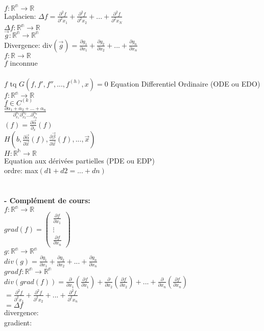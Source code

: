 \documentclass{article}
\begin{document}
    $f:\mathbb{R^n}\to \mathbb{R}$\\
    Laplacien: $\Delta f= \frac{\partial^2 f}{\partial^2 x_1} +
    \frac{\partial^2 f}{\partial^2 x_2}+...+\frac{\partial^2 f}{\partial^2 x_N}$\\
    $\Delta f: \mathbb{R^n}\to \mathbb{R}$\\
    $\vec{g}: \mathbb{R^n}\to \mathbb{R^n}$\\
    Divergence: div$(\vec{g})=\frac{\partial g_1}{\partial x_1}+
    \frac{\partial g_2}{\partial x_2}+...+
    \frac{\partial g_n}{\partial x_n}$\\
    $f:\mathbb{R}\to \mathbb{R}$\\
    $f$ inconnue\\\\
    $f$ tq $G(f,f',f'',...,f^{(h)},x)=0$ Equation Differentiel Ordinaire (ODE ou EDO)\\
    $f:\mathbb{R^n}\to \mathbb{R}$\\
    $f \in C^{(k)}$\\
    $\frac{\partial{\alpha_1 +\alpha_2+...+\alpha_n}}{\partial^{\alpha_1}_{x_1}
    \partial^{\alpha_2}_{x_2} ... \partial^{\alpha_n}_{x_n}}$\\
    $(f)=\frac{\partial \vec{\alpha}}{\partial_x}(f)$\\
    $H(b,\frac{\partial \vec{\alpha}}{\partial \vec{x}}(f),\frac{\partial \vec{\beta}}{\partial \vec{x}}(f),...,\vec{x})$\\
    $H:\mathbb{R^h}\to \mathbb{R}$\\
    Equation aux dérivées partielles (PDE ou EDP)\\
    ordre: max$(d1+d2=...+dn)$\\\\\\
    \textbf{- Complément de cours:}\\
    $f:\mathbb{R^n}\to \mathbb{R}$\\
    $grad(f)=
    \begin{pmatrix}
        \frac{\partial f}{\partial x_1}\\
        \vdots\\
        \frac{\partial f}{\partial x_n}    
    \end{pmatrix}$\\
    $g:\mathbb{R^n}\to \mathbb{R^n}$\\
    $div(g)=\frac{\partial g_1}{\partial x_1}+\frac{\partial g_2}{\partial x_2}+...+\frac{\partial g_n}{\partial x_n}$\\
    $grad f:\mathbb{R^n}\to \mathbb{R^n}$\\
    $div(grad(f))=\frac{\partial}{\partial x_1}(\frac{\partial f}{\partial x_1})+\frac{\partial}{\partial x_2}(\frac{\partial f}{\partial x_2})+...+\frac{\partial}{\partial x_n}(\frac{\partial f}{\partial x_n})$\\
    $=\frac{\partial^2 f}{\partial^2 x_1}+\frac{\partial^2 f}{\partial^2 x_2}+...+\frac{\partial^2 f}{\partial^2 x_n}$\\
    $=\Delta f$\\
    divergence:  \\
    gradient: \\
\end{document}
